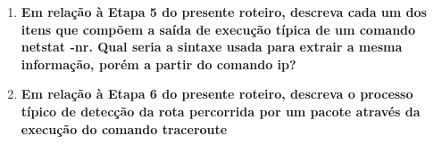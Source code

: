 \begin{enumerate}
  \item \textbf{Em relação à Etapa 5 do presente roteiro, descreva cada um dos itens que compõem a saída
    de execução típica de um comando netstat -nr. Qual seria a sintaxe usada para extrair a
    mesma informação, porém a partir do comando ip?}

  \item \textbf{Em relação à Etapa 6 do presente roteiro, descreva o processo típico de detecção da rota
    percorrida por um pacote através da execução do comando traceroute}

\end{enumerate}
